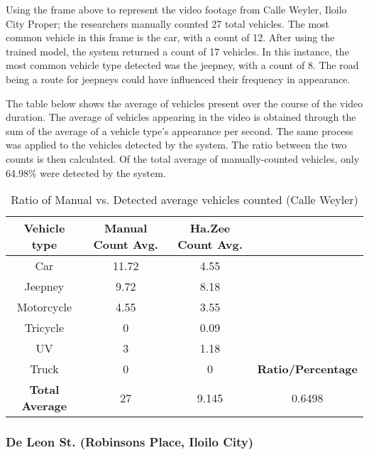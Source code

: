 Using the frame above to represent the video footage from Calle Weyler, Iloilo City Proper; the researchers manually counted 27 total vehicles. The most common vehicle in this frame is the car, with a count of 12. After using the trained model, the system returned a count of 17 vehicles. In this instance, the most common vehicle type detected was the jeepney, with a count of 8. The road being a route for jeepneys could have influenced their frequency in appearance.

The table below shows the average of vehicles present over the course of the video duration. The average of vehicles appearing in the video is obtained through the sum of the average of a vehicle type’s appearance per second. The same process was applied to the vehicles detected by the system. The ratio between the two counts is then calculated. Of the total average of manually-counted vehicles, only 64.98\% were detected by the system. 



\begin{table}[ht]   %
	\centering
	\caption{Ratio of Manual vs. Detected average vehicles counted  (Calle Weyler)} \vspace{0.25em}
	\begin{tabular}{|c|c|c|c|} \hline
		\centering \textbf {Vehicle type} & Manual Count Avg. & Ha.Zee Count Avg.	&  \\ \hline
		Car & 11.72 & 4.55  &   \\ \hline
		Jeepney & 9.72 & 8.18  &	\\ \hline
		Motorcycle& 4.55  & 3.55  & \\ \hline
		Tricycle   & 0  & 0.09 & \\ \hline
		UV & 3 & 1.18 & \\ \hline
		Truck & 0 & 0 & \textbf{Ratio/Percentage}\\ \hline
		
		\textbf{Total Average} &27 & 9.145 & 0.6498\\ \hline
		
	\end{tabular}
	\label{tab:calle_waley}
\end{table}


\subsubsection{De Leon St.  (Robinsons Place, Iloilo City)
}


